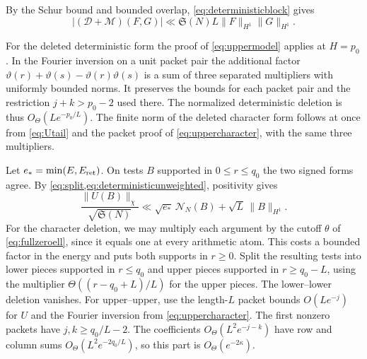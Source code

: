 \documentclass[11pt,a4paper]{article}
\numberwithin{equation}{section}
\newcommand{\SSS}{\mathfrak S}
\newcommand{\NN}{\mathcal N_N}
\begin{document}
By the Schur bound and bounded overlap, \cref{eq:deterministicblock}
gives
\begin{equation}
 |(\mathcal D+\mathcal M)(F,G)|
       \ll \SSS(N)L\|F\|_{H^1}\|G\|_{H^1}.
 \label{eq:deterministicunweighted}
\end{equation}

For the deleted deterministic form the proof of
\cref{eq:uppermodel} applies at $H=p_0$. In the Fourier inversion
on a unit packet pair the additional factor
$\vartheta(r)+\vartheta(s)-\vartheta(r)\vartheta(s)$ is a sum
of three separated multipliers with uniformly bounded norms.
It preserves the bounds for each packet pair and the
restriction $j+k>p_0-2$ used there. The normalized deterministic
deletion is thus $O_\Theta(Le^{-p_0/L})$.
The finite norm of the deleted character form follows at once
from \cref{eq:Utail} and the packet proof of
\cref{eq:uppercharacter}, with the same three multipliers.

Let $e_*=\min(E,E_{\rm ret})$. On tests $B$ supported in
$0\le r\le q_0$ the two signed forms agree. By
\cref{eq:split,eq:deterministicunweighted}, positivity gives
\begin{equation}
 \frac{\|U(B)\|_\chi}{\sqrt{\SSS(N)}}
 \ll \sqrt{e_*}\,\NN(B)+\sqrt L\,\|B\|_{H^1}.
 \label{eq:asymupperpositivity}
\end{equation}
For the character deletion, we may multiply each argument by
the cutoff $\theta$ of \cref{eq:fullzeroell}, since it equals one
at every arithmetic atom. This costs a bounded factor in the
energy and puts both supports in $r\ge0$. Split the resulting
tests into lower pieces supported in $r\le q_0$ and upper pieces
supported in $r\ge q_0-L$, using the multiplier
$\Theta((r-q_0+L)/L)$ for the upper pieces. The lower--lower
deletion vanishes. For upper--upper, use the length-$L$ packet
bounds $O(Le^{-j})$ for $U$ and the Fourier inversion from
\cref{eq:uppercharacter}. The first nonzero packets have
$j,k\ge q_0/L-2$. The coefficients $O_\Theta(L^2e^{-j-k})$
have row and column sums $O_\Theta(L^2e^{-2q_0/L})$, so this
part is $O_\Theta(e^{-2\kappa})$.
\end{document}
